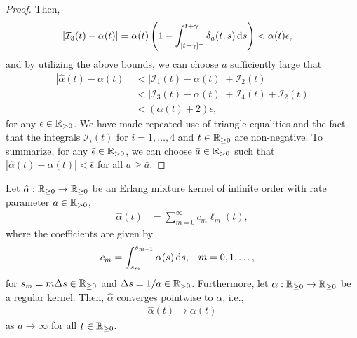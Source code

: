 \begin{proof}
	Then,
	\begin{align}
		|\mathcal I_3(t) - \alpha(t)| &= \alpha(t) \left(1 - \int_{[t - \gamma]^+}^{t + \gamma} \delta_a(t, s) \,\mathrm{d} s\right) < \alpha(t) \epsilon,
	\end{align}
	and by utilizing the above bounds, we can choose $a$ sufficiently large that
	\begin{align}
		|\hat \alpha(t) - \alpha(t)|
		&< |\mathcal I_1(t) - \alpha(t)| + \mathcal I_2(t) \nonumber \\
		&< |\mathcal I_3(t) - \alpha(t)| + \mathcal I_4(t) + \mathcal I_2(t) \nonumber \\
		&< (\alpha(t) + 2) \epsilon,
	\end{align}
	for any $\epsilon \in \mathbb{R}_{> 0}$. We have made repeated use of triangle equalities and the fact that the integrals $\mathcal I_i(t)$ for $i = 1, \ldots, 4$ and $t \in \mathbb{R}_{\geq 0}$ are non-negative. To summarize, for any $\bar \epsilon \in \mathbb{R}_{> 0}$, we can choose $\bar a \in \mathbb{R}_{> 0}$ such that $|\hat \alpha(t) - \alpha(t)| < \bar \epsilon$ for all $a \geq \bar a$.
\end{proof}
%
\begin{theorem}\label{thm:erlang:mixture:approximation}
	Let $\hat \alpha: \mathbb{R}_{\geq 0} \rightarrow \mathbb{R}_{\geq 0}$ be an Erlang mixture kernel of infinite order with rate parameter $a \in \mathbb{R}_{> 0}$,
	\begin{align}
		\hat \alpha(t) &= \sum_{m=0}^\infty c_m \ell_m(t),
	\end{align}
	where the coefficients are given by
	\begin{align}\label{eq:erlang:mixture:approximation:coefficients}
		c_m &= \int_{s_m}^{s_{m+1}} \alpha(s) \,\mathrm{d} s, & m &= 0, 1, \ldots,
	\end{align}
	for $s_m = m \Delta s \in \mathbb{R}_{\geq 0}$ and $\Delta s = 1/a \in \mathbb{R}_{> 0}$. Furthermore, let $\alpha: \mathbb{R}_{\geq 0} \rightarrow \mathbb{R}_{\geq 0}$ be a regular kernel. Then, $\hat \alpha$ converges pointwise to $\alpha$, i.e.,
	\begin{align}
		\hat \alpha(t) \rightarrow \alpha(t)
	\end{align}
	as $a \rightarrow \infty$ for all $t \in \mathbb{R}_{\geq 0}$.
\end{theorem}
%
